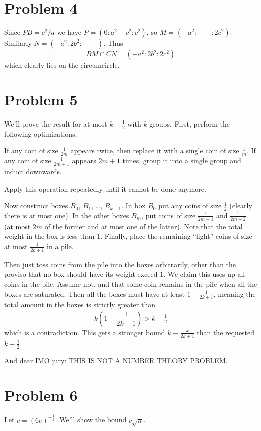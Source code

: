 \documentclass[11pt]{scrreprt}
\numberwithin{figure}{chapter}
\begin{document}
\section{Problem 4}
Since $PB = c^2/a$ we have $P = (0 : a^2-c^2 : c^2)$, so $M = (-a^2 : {--} : 2c^2)$.
Similarly $N = (-a^2 : 2b^2 : {--})$. Thus
\[ \overline{BM} \cap \overline{CN} = (-a^2 : 2b^2 : 2c^2) \]
which clearly lies on the circumcircle.


\section{Problem 5}
We'll prove the result for at most $k - \tfrac 12$ with $k$ groups.
First, perform the following optimizations.
\begin{itemize}
  \ii If any coin of size $\frac{1}{2m}$ appears twice, then replace it with a single coin of size $\frac{1}{m}$.
  \ii If any coin of size $\frac{1}{2m+1}$ appears $2m+1$ times, group it into a single group and induct downwards.
\end{itemize}
Apply this operation repeatedly until it cannot be done anymore.

Now construct boxes $B_0$, $B_1$, \dots, $B_{k-1}$.
In box $B_0$ put any coins of size $\tfrac 12$ (clearly there is at most one).
In the other boxes $B_m$, put coins of size $\frac{1}{2m+1}$ and
$\frac{1}{2m+2}$ (at most $2m$ of the former and at most one of the latter).
Note that the total weight in the box is less than $1$.
Finally, place the remaining ``light'' coins of size at most $\frac{1}{2k+1}$ in a pile.

Then just toss coins from the pile into the boxes arbitrarily,
other than the proviso that no box should have its weight exceed $1$.
We claim this uses up all coins in the pile.
Assume not, and that some coin remains in the pile when all the boxes are saturated.
Then all the boxes must have at least $1 -\frac{1}{2k+1}$,
meaning the total amount in the boxes is strictly greater than
\[ k \left( 1 - \frac{1}{2k+1} \right) > k - \tfrac 12 \]
which is a contradiction. This gets a stronger bound $k - \frac{k}{2k+1}$ than the requested $k-\tfrac 12$.

And dear IMO jury: THIS IS NOT A NUMBER THEORY PROBLEM.


\section{Problem 6}
Let $c = (6e)^{-\frac12}$. We'll show the bound $c \sqrt n$.
\end{document}
